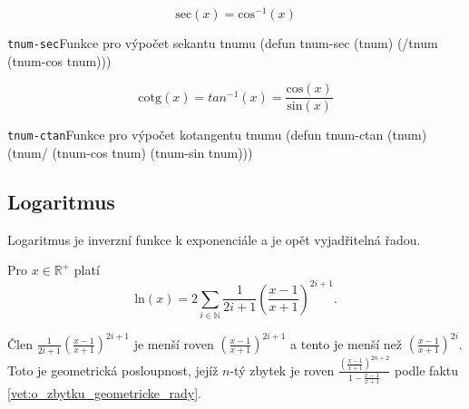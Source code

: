 \begin{fact}
  \begin{equation}
    \mathrm{sec}(x)=\mathrm{cos}^{-1}(x)
  \end{equation}
\end{fact}
\begin{lispcode}{\texttt{tnum-sec}}{Funkce pro výpočet sekantu tnumu}
(\textcolor{funkcionalni}{defun} \textcolor{pojmenovan}{tnum-sec} (tnum)
  (\textcolor{moje}{/tnum} (\textcolor{moje}{tnum-cos} tnum)))
\end{lispcode}

\begin{fact}
  \begin{equation}
    \mathrm{cotg}(x)=tan^{-1}(x)=\frac{\mathrm{cos}(x)}{\mathrm{sin}(x)}
  \end{equation}
\end{fact}
\begin{lispcode}{\texttt{tnum-ctan}}{Funkce pro výpočet kotangentu tnumu}
(\textcolor{funkcionalni}{defun} \textcolor{pojmenovan}{tnum-ctan} (tnum)
  (\textcolor{moje}{tnum/} (\textcolor{moje}{tnum-cos} tnum) (\textcolor{moje}{tnum-sin} tnum)))
\end{lispcode}

\subsection{Logaritmus}
Logaritmus je inverzní funkce k exponenciále a je opět vyjadřitelná řadou.
\begin{fact}
Pro $x\in\mathbb{R}^+$ platí
  \begin{equation}\label{rov:rad:ln}
    \mathrm{ln}(x)=2\sum_{i\in\mathbb{N}}\frac{1}{2i+1}\left(\frac{x-1}{x+1}\right)^{2i+1}.
  \end{equation}
\end{fact}

Člen $\frac{1}{2i+1}(\frac{x-1}{x+1})^{2i+1}$ je menší roven $(\frac{x-1}{x+1})^{2i+1}$ a  tento je menší než $(\frac{x-1}{x+1})^{2i}$. Toto je geometrická posloupnost, jejíž $n$-tý zbytek je roven $\frac{(\frac{x-1}{x+1})^{2n+2}}{1-\frac{x-1}{x+1}}$ podle faktu \ref{vet:o_zbytku_geometricke_rady}.

